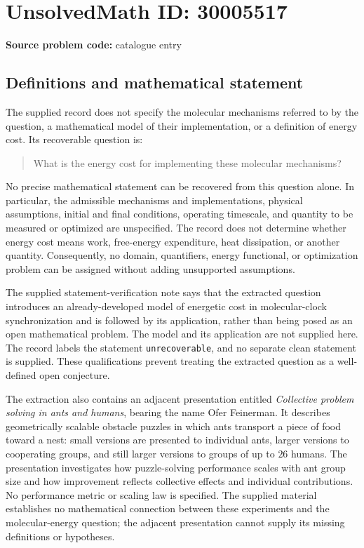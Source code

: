 \documentclass[11pt]{article}
\begin{document}
\section*{UnsolvedMath ID: 30005517}
\textbf{Source problem code:} catalogue entry
\subsection{Definitions and mathematical statement}
The supplied record does not specify the molecular mechanisms referred to by the question, a mathematical model of their implementation, or a definition of energy cost. Its recoverable question is:
\begin{quote}
What is the energy cost for implementing these molecular mechanisms?
\end{quote}
No precise mathematical statement can be recovered from this question alone. In particular, the admissible mechanisms and implementations, physical assumptions, initial and final conditions, operating timescale, and quantity to be measured or optimized are unspecified. The record does not determine whether energy cost means work, free-energy expenditure, heat dissipation, or another quantity. Consequently, no domain, quantifiers, energy functional, or optimization problem can be assigned without adding unsupported assumptions.

The supplied statement-verification note says that the extracted question introduces an already-developed model of energetic cost in molecular-clock synchronization and is followed by its application, rather than being posed as an open mathematical problem. The model and its application are not supplied here. The record labels the statement \texttt{unrecoverable}, and no separate clean statement is supplied. These qualifications prevent treating the extracted question as a well-defined open conjecture.

The extraction also contains an adjacent presentation entitled \emph{Collective problem solving in ants and humans}, bearing the name Ofer Feinerman. It describes geometrically scalable obstacle puzzles in which ants transport a piece of food toward a nest: small versions are presented to individual ants, larger versions to cooperating groups, and still larger versions to groups of up to \(26\) humans. The presentation investigates how puzzle-solving performance scales with ant group size and how improvement reflects collective effects and individual contributions. No performance metric or scaling law is specified. The supplied material establishes no mathematical connection between these experiments and the molecular-energy question; the adjacent presentation cannot supply its missing definitions or hypotheses.
\end{document}
